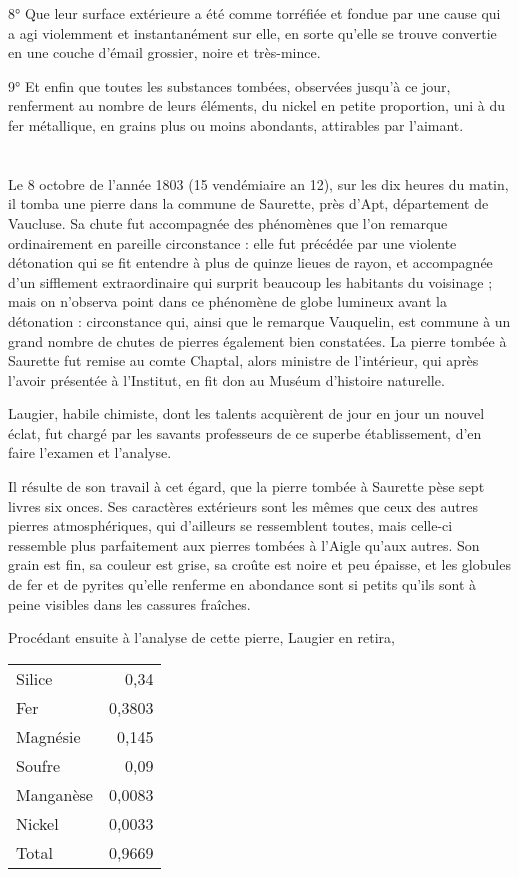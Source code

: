 \documentclass[a4paper, 12pt, oneside, french]{article}
\begin{document}
8° Que leur surface extérieure a été comme torréfiée et fondue par une cause qui a agi violemment et instantanément sur elle, en sorte qu'elle se trouve convertie en une couche d'émail grossier, noire et très-mince.

9° Et enfin que toutes les substances tombées, observées jusqu'à ce jour, renferment au nombre de leurs éléments, du nickel en petite proportion, uni à du fer métallique, en grains plus ou moins abondants, attirables par l'aimant.
\clearpage
\section{}
\paragraph{}
Le 8 octobre de l'année 1803 (15 vendémiaire an 12), sur les dix heures du matin, il tomba une pierre dans la commune de Saurette, près d'Apt, département de Vaucluse. Sa chute fut accompagnée des phénomènes que l'on remarque ordinairement en pareille circonstance : elle fut précédée par une violente détonation qui se fit entendre à plus de quinze lieues de rayon, et accompagnée d'un sifflement extraordinaire qui surprit beaucoup les habitants du voisinage ; mais on n'observa point dans ce phénomène de globe lumineux avant la détonation : circonstance qui, ainsi que le remarque Vauquelin, est commune à un grand nombre de chutes de pierres également bien constatées. La pierre tombée à Saurette fut remise au comte Chaptal, alors ministre de l'intérieur, qui après l'avoir présentée à l'Institut, en fit don au Muséum d'histoire naturelle.

Laugier, habile chimiste, dont les talents acquièrent de jour en jour un nouvel éclat, fut chargé par les savants professeurs de ce superbe établissement, d'en faire l'examen et l'analyse.

Il résulte de son travail à cet égard, que la pierre tombée à Saurette pèse sept livres six onces. Ses caractères extérieurs sont les mêmes que ceux des autres pierres atmosphériques, qui d'ailleurs se ressemblent toutes, mais celle-ci ressemble plus parfaitement aux pierres tombées à l'Aigle qu'aux autres. Son grain est fin, sa couleur est grise, sa croûte est noire et peu épaisse, et les globules de fer et de pyrites qu'elle renferme en abondance sont si petits qu'ils sont à peine visibles dans les cassures fraîches.

Procédant ensuite à l'analyse de cette pierre, Laugier en retira,
\begin{table}[H]
    \centering
    \Fontauri
    \large
    \begin{tabular}{l r}
        Silice & 0,34 \\
        Fer & 0,3803 \\
        Magnésie & 0,145 \\
        Soufre & 0,09 \\
        Manganèse & 0,0083 \\
        Nickel & 0,0033 \\ \hline
        Total & 0,9669 \\
    \end{tabular}
\end{table}
\end{document}
